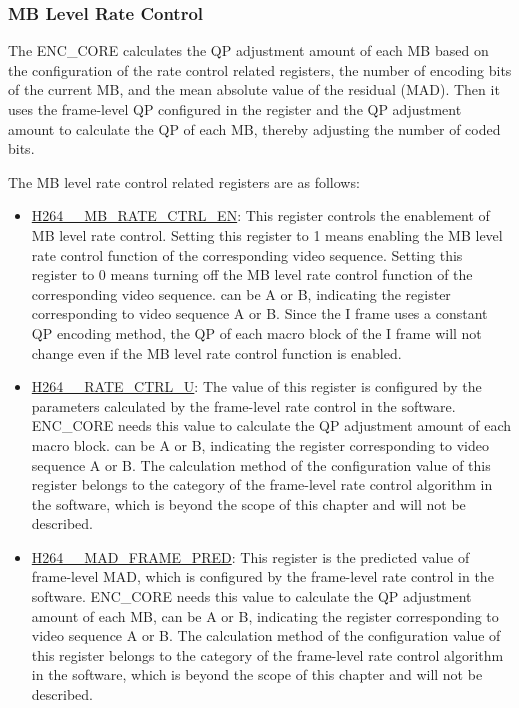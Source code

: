 \documentclass[main\_\_EN.tex]{subfiles}
\begin{document}
\subsubsection{MB Level Rate Control}\label{sec:h264-rate-ctrl}
The ENC\_CORE calculates the QP adjustment amount of each MB based on the configuration of the rate control related registers, the number of encoding bits of the current MB, and the mean absolute value of the residual (MAD). Then it uses the frame-level QP configured in the register and the QP adjustment amount to calculate the QP of each MB, thereby adjusting the number of coded bits.


The MB level rate control related registers are as follows:
\begin{itemize}
    \item \hyperref[fielddesc:H264AMBRATECTRLEN]{H264\_\_MB\_RATE\_CTRL\_EN}: This register controls the enablement of MB level rate control. Setting this register to 1 means enabling the MB level rate control function of the corresponding video sequence. Setting this register to 0 means turning off the MB level rate control function of the corresponding video sequence.  can be A or B, indicating the register corresponding to video sequence A or B. Since the I frame uses a constant QP encoding method, the QP of each macro block of the I frame will not change even if the MB level rate control function is enabled.
    \item \hyperref[fielddesc:H264ARATECTRLU]{H264\_\_RATE\_CTRL\_U}: The value of this register is configured by the parameters calculated by the frame-level rate control in the software. ENC\_CORE needs this value to calculate the QP adjustment amount of each macro block.  can be A or B, indicating the register corresponding to video sequence A or B. The calculation method of the configuration value of this register belongs to the category of the frame-level rate control algorithm in the software, which is beyond the scope of this chapter and will not be described.
    \item \hyperref[fielddesc:H264AMADFRAMEPRED]{H264\_\_MAD\_FRAME\_PRED}: This register is the predicted value of frame-level MAD, which is configured by the frame-level rate control in the software. ENC\_CORE needs this value to calculate the QP adjustment amount of each MB,  can be A or B, indicating the register corresponding to video sequence A or B. The calculation method of the configuration value of this register belongs to the category of the frame-level rate control algorithm in the software, which is beyond the scope of this chapter and will not be described.

\end{itemize}
\end{document}
